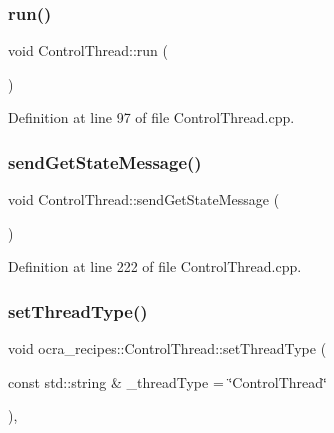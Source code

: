 \subsubsection{\texorpdfstring{run()}{run()}}
{\footnotesize\ttfamily void Control\+Thread\+::run (\begin{DoxyParamCaption}{ }\end{DoxyParamCaption})\hspace{0.3cm}{\ttfamily [virtual]}}



Definition at line 97 of file Control\+Thread.\+cpp.

\hypertarget{classocra__recipes_1_1ControlThread_a53191169bc860dc92314fe65bab83c97}{}\label{classocra__recipes_1_1ControlThread_a53191169bc860dc92314fe65bab83c97} 
\subsubsection{\texorpdfstring{send\+Get\+State\+Message()}{sendGetStateMessage()}}
{\footnotesize\ttfamily void Control\+Thread\+::send\+Get\+State\+Message (\begin{DoxyParamCaption}{ }\end{DoxyParamCaption})\hspace{0.3cm}{\ttfamily [protected]}}



Definition at line 222 of file Control\+Thread.\+cpp.

\hypertarget{classocra__recipes_1_1ControlThread_a62d882d2bad8a2468cbc080cad101a1f}{}\label{classocra__recipes_1_1ControlThread_a62d882d2bad8a2468cbc080cad101a1f} 
\subsubsection{\texorpdfstring{set\+Thread\+Type()}{setThreadType()}}
{\footnotesize\ttfamily void ocra\+\_\+recipes\+::\+Control\+Thread\+::set\+Thread\+Type (\begin{DoxyParamCaption}\item[{const std\+::string \&}]{\+\_\+thread\+Type = {\ttfamily \char`\"{}ControlThread\char`\"{}} }\end{DoxyParamCaption})\hspace{0.3cm}{\ttfamily [inline]}, {\ttfamily [protected]}}



